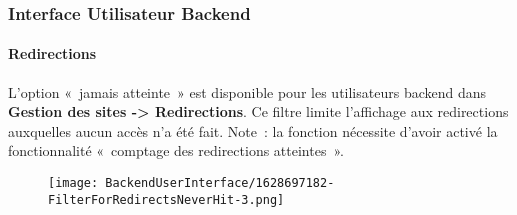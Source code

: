 %

\begin{frame}[fragile]
	\frametitle{Interface Utilisateur Backend}
	\framesubtitle{Redirections}

	L'option «~jamais atteinte~» est disponible pour les utilisateurs backend dans \textbf{Gestion des sites -> Redirections}.
	Ce filtre limite l'affichage aux redirections auxquelles aucun accès n'a été fait.\newline
	\small
		Note~: la fonction nécessite d'avoir activé la fonctionnalité «~comptage des redirections atteintes~».
	\normalsize

	\begin{figure}
		\texttt{[image: BackendUserInterface/1628697182-FilterForRedirectsNeverHit-3.png]}
	\end{figure}

\end{frame}

